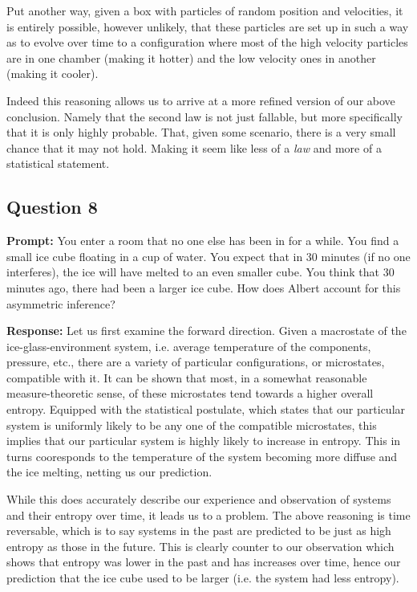 \documentclass{article}
\begin{document}
Put another way, given a box with particles of random position and velocities, it is entirely possible, however unlikely, that these particles are set up in such a way as to evolve over time to a configuration where most of the high velocity particles are in one chamber (making it hotter) and the low velocity ones in another (making it cooler).

Indeed this reasoning allows us to arrive at a more refined version of our above conclusion. Namely that the second law is not just fallable, but more specifically that it is only highly probable. That, given some scenario, there is a very small chance that it may not hold. Making it seem like less of a \textit{law} and more of a statistical statement.
\newpage

\subsection*{Question 8}
\noindent\textbf{Prompt:} You enter a room that no one else has been in for a while. You find a small ice cube floating in a cup of water. You expect that in 30 minutes (if no one interferes), the ice will have melted to an even smaller cube. You think that 30 minutes ago, there had been a larger ice cube. How does Albert account for this asymmetric inference?
\bigskip

\noindent\textbf{Response:} Let us first examine the forward direction. Given a macrostate of the ice-glass-environment system, i.e. average temperature of the components, pressure, etc., there are a variety of particular configurations, or microstates, compatible with it. It can be shown that most, in a somewhat reasonable measure-theoretic sense, of these microstates tend towards a higher overall entropy. Equipped with the statistical postulate, which states that our particular system is uniformly likely to be any one of the compatible microstates, this implies that our particular system is highly likely to increase in entropy. This in turns cooresponds to the temperature of the system becoming more diffuse and the ice melting, netting us our prediction.

While this does accurately describe our experience and observation of systems and their entropy over time, it leads us to a problem. The above reasoning is time reversable, which is to say systems in the past are predicted to be just as high entropy as those in the future. This is clearly counter to our observation which shows that entropy was lower in the past and has increases over time, hence our prediction that the ice cube used to be larger (i.e. the system had less entropy).
\end{document}
